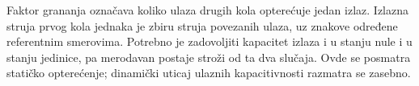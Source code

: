 Faktor grananja označava koliko ulaza drugih kola opterećuje jedan izlaz. Izlazna struja prvog kola jednaka je zbiru struja povezanih ulaza, uz znakove određene referentnim smerovima. Potrebno je zadovoljiti kapacitet izlaza i u stanju nule i u stanju jedinice, pa merodavan postaje stroži od ta dva slučaja. Ovde se posmatra statičko opterećenje; dinamički uticaj ulaznih kapacitivnosti razmatra se zasebno.
